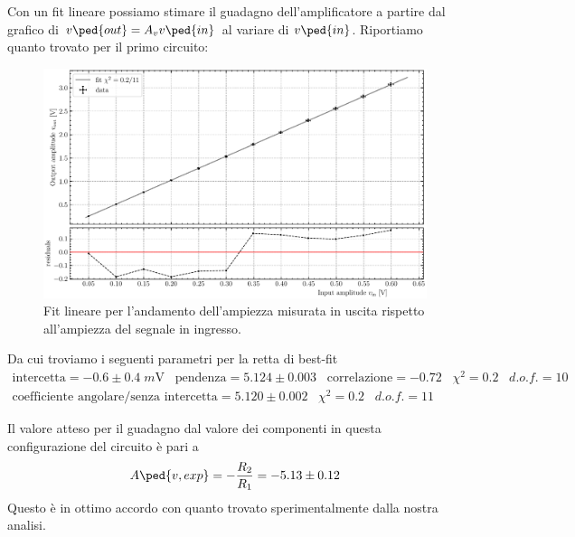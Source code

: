 \documentclass[10pt,a4paper]{article}
\begin{document}
Con un fit lineare possiamo stimare il guadagno dell'amplificatore a partire
dal grafico di $v\ped{out} = A_v v\ped{in}$ al variare di $v\ped{in}$.
Riportiamo quanto trovato per il primo circuito:
\begin{figure}[htbp]
\centering
\includegraphics[scale=0.7]{gain5k1}
\caption{Fit lineare per l'andamento dell'ampiezza misurata in uscita rispetto
all'ampiezza del segnale in ingresso. \label{fig: gainfit}}
\end{figure}
Da cui troviamo i seguenti parametri per la retta di best-fit
\begin{align*}
\mathrm{intercetta} = -0.6 \pm 0.4 \; \si{m\V} \;\;\;\mathrm{pendenza} = 5.124 \pm 0.003 \;\;\;\mathrm{correlazione} 
= -0.72 \;\;\; \chi^2 = 0.2 \;\;\; d.o.f. = 10 \\
\text{coefficiente angolare/senza intercetta} = 5.120 \pm 0.002 \;\;\;
\chi^2 = 0.2 \;\;\; d.o.f. = 11
\end{align*}

Il valore atteso per il guadagno dal valore dei componenti in questa
configurazione del circuito è pari a
\[
A\ped{v, exp} = -\frac{R_2}{R_1} = - 5.13 \pm 0.12
\]
Questo è in ottimo accordo con quanto trovato sperimentalmente dalla nostra
analisi.
\end{document}
